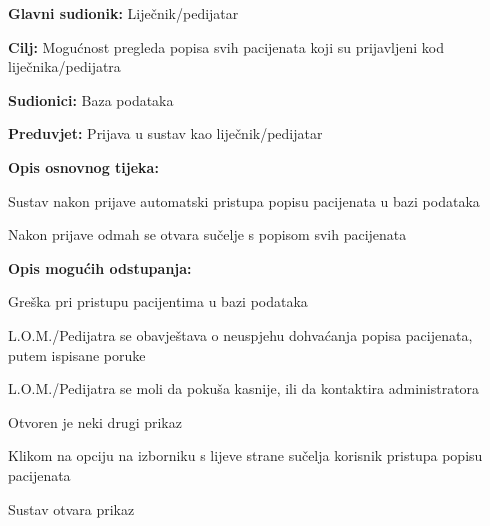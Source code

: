 					\noindent {}
					\begin{packed_item}
						
						\item \textbf{Glavni sudionik: }Liječnik/pedijatar
						\item  \textbf{Cilj:} Mogućnost pregleda popisa svih pacijenata koji su prijavljeni kod liječnika/pedijatra
						\item  \textbf{Sudionici:} Baza podataka
						\item  \textbf{Preduvjet:} Prijava u sustav kao liječnik/pedijatar
						\item  \textbf{Opis osnovnog tijeka:}
						
						\item[] \begin{packed_enum}
							\item Sustav nakon prijave automatski pristupa popisu pacijenata u bazi podataka
							\item Nakon prijave odmah se otvara sučelje s popisom svih pacijenata
						\end{packed_enum}
						\item  \textbf{Opis mogućih odstupanja:}
						\item[] \begin{packed_item}
							
							\item[1.a] Greška pri pristupu pacijentima u bazi podataka
							\item[] \begin{packed_enum}
								
								\item L.O.M./Pedijatra se obavještava o neuspjehu dohvaćanja popisa pacijenata, putem ispisane poruke
								\item L.O.M./Pedijatra se moli da pokuša kasnije, ili da kontaktira administratora
								
							\end{packed_enum}
							
							\item[2.a] Otvoren je neki drugi prikaz
							\item[] \begin{packed_enum}
								
								\item Klikom na opciju na izborniku s lijeve strane sučelja korisnik pristupa popisu pacijenata
								\item Sustav otvara prikaz
								
							\end{packed_enum}
						\end{packed_item}
					\end{packed_item}
					
